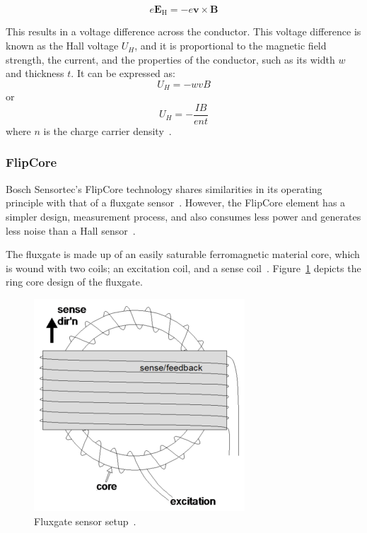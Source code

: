 \documentclass[DIV=14]{scrartcl}
\begin{document}
    \begin{equation}
        e\boldsymbol{E_{\mathrm{H}}} = -e\boldsymbol{v} \times \boldsymbol{B}
        \label{eq:forceBalances}
    \end{equation}

    This results in a voltage difference across the conductor.
    This voltage difference is known as the Hall voltage $U_H$, and it is proportional to the magnetic field
    strength, the current, and the properties of the conductor, such as its width $w$ and thickness $t$.
    It can be expressed as:
    \begin{equation}
        U_H = -wvB
        \label{eq:hallVoltageWidht}
    \end{equation}
    or
    \begin{equation}
        U_H = -\frac{IB}{ent}
        \label{eq:hallVoltageCurrent}
    \end{equation}
    where $n$ is the charge carrier density~\cite{labManual}.

    \subsubsection{FlipCore}\label{subsubsec:flipcore}
    Bosch Sensortec's FlipCore technology shares similarities in its operating principle with that of a fluxgate sensor~\cite{labManual}.
    However, the FlipCore element has a simpler design, measurement process, and also consumes less power
    and generates less noise than a Hall sensor~\cite{labManual}.

    The fluxgate is made up of an easily saturable ferromagnetic material core, which is wound with two coils;
    an excitation coil, and a sense coil~\cite{fluxGate}.
    Figure~\ref{fig:fluxGate} depicts the ring core design of the fluxgate.

    \begin{figure}[hbt!]
        \centering
        \includegraphics[width=.4\textwidth]{figures/fluxgate}
        \caption{Fluxgate sensor setup~\cite{flixGateImage}.}
        \label{fig:fluxGate}
    \end{figure}
\end{document}
